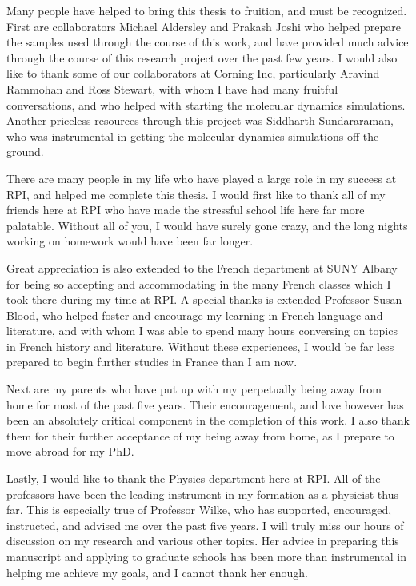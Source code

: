  
Many people have helped to bring this thesis to fruition, and must be recognized. First are collaborators Michael Aldersley and Prakash Joshi who helped prepare the samples used through the course of this work, and have provided much advice through the course of this research project over the past few years. I would also like to thank some of our collaborators at Corning Inc, particularly Aravind Rammohan and Ross Stewart, with whom I have had many fruitful conversations, and who helped with starting the molecular dynamics simulations. Another priceless resources through this project was Siddharth Sundararaman, who was instrumental in getting the molecular dynamics simulations off the ground.

There are many people in my life who have played a large role in my success at RPI, and helped me complete this thesis. I would first like to thank all of my friends here at RPI who have made the stressful school life here far more palatable. Without all of you, I would have surely gone crazy, and the long nights working on homework would have been far longer.

Great appreciation is also extended to the French department at SUNY Albany for being so accepting and accommodating in the many French classes which I took there during my time at RPI. A special thanks is extended Professor Susan Blood, who helped foster and encourage my learning in French language and literature, and with whom I was able to spend many hours conversing on topics in French history and literature. Without these experiences, I would be far less prepared to begin further studies in France than I am now.

Next are my parents who have put up with my perpetually being away from home for most of the past five years. Their encouragement, and love however has been an absolutely critical component in the completion of this work. I also thank them for their further acceptance of my being away from home, as I prepare to move abroad for my PhD.

Lastly, I would like to thank the Physics department here at RPI. All of the professors have been the leading instrument in my formation as a physicist thus far. This is especially true of Professor Wilke, who has supported, encouraged, instructed, and advised me over the past five years. I will truly miss our hours of discussion on my research and various other topics. Her advice in preparing this manuscript and applying to graduate schools has been more than instrumental in helping me achieve my goals, and I cannot thank her enough.